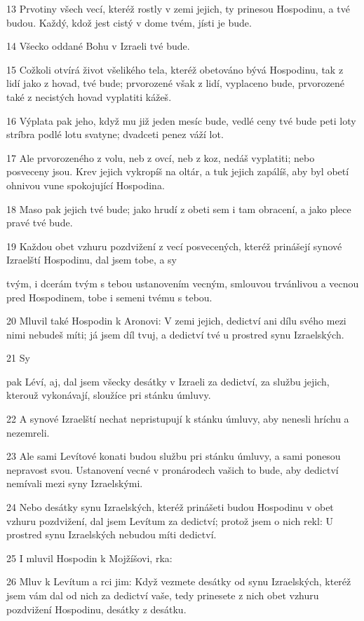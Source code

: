 \par 13 Prvotiny všech vecí, kteréž rostly v zemi jejich, ty prinesou Hospodinu, a tvé budou. Každý, kdož jest cistý v dome tvém, jísti je bude.
\par 14 Všecko oddané Bohu v Izraeli tvé bude.
\par 15 Cožkoli otvírá život všelikého tela, kteréž obetováno bývá Hospodinu, tak z lidí jako z hovad, tvé bude; prvorozené však z lidí, vyplaceno bude, prvorozené také z necistých hovad vyplatiti kážeš.
\par 16 Výplata pak jeho, když mu již jeden mesíc bude, vedlé ceny tvé bude peti loty stríbra podlé lotu svatyne; dvadceti penez váží lot.
\par 17 Ale prvorozeného z volu, neb z ovcí, neb z koz, nedáš vyplatiti; nebo posveceny jsou. Krev jejich vykropíš na oltár, a tuk jejich zapálíš, aby byl obetí ohnivou vune spokojující Hospodina.
\par 18 Maso pak jejich tvé bude; jako hrudí z obeti sem i tam obracení, a jako plece pravé tvé bude.
\par 19 Každou obet vzhuru pozdvižení z vecí posvecených, kteréž prinášejí synové Izraelští Hospodinu, dal jsem tobe, a sy\par tvým, i dcerám tvým s tebou ustanovením vecným, smlouvou trvánlivou a vecnou pred Hospodinem, tobe i semeni tvému s tebou.
\par 20 Mluvil také Hospodin k Aronovi: V zemi jejich, dedictví ani dílu svého mezi nimi nebudeš míti; já jsem díl tvuj, a dedictví tvé u prostred synu Izraelských.
\par 21 Sy\par pak Léví, aj, dal jsem všecky desátky v Izraeli za dedictví, za službu jejich, kterouž vykonávají, sloužíce pri stánku úmluvy.
\par 22 A synové Izraelští nechat nepristupují k stánku úmluvy, aby nenesli hríchu a nezemreli.
\par 23 Ale sami Levítové konati budou službu pri stánku úmluvy, a sami ponesou nepravost svou. Ustanovení vecné v pronárodech vašich to bude, aby dedictví nemívali mezi syny Izraelskými.
\par 24 Nebo desátky synu Izraelských, kteréž prinášeti budou Hospodinu v obet vzhuru pozdvižení, dal jsem Levítum za dedictví; protož jsem o nich rekl: U prostred synu Izraelských nebudou míti dedictví.
\par 25 I mluvil Hospodin k Mojžíšovi, rka:
\par 26 Mluv k Levítum a rci jim: Když vezmete desátky od synu Izraelských, kteréž jsem vám dal od nich za dedictví vaše, tedy prinesete z nich obet vzhuru pozdvižení Hospodinu, desátky z desátku.
